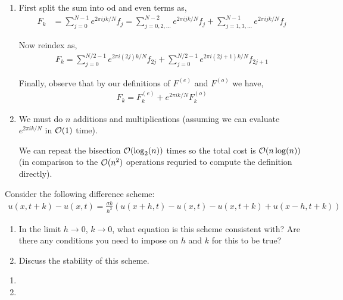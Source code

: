 \documentclass[10pt]{article}
\begin{document}
\begin{solution}[Solution]
    \begin{enumerate}[label=(\alph*)]
    \item
        First split the sum into od and even terms as,
            \begin{align*}
                F_k &= \sum_{j=0}^{N-1}e^{2\pi i j k/N} f_j 
                = \sum_{j=0,2,\ldots}^{N-2} e^{2\pi i j k/N} f_j + \sum_{j=1,3,\ldots}^{N-1} e^{2\pi i j k/N} f_j
            \end{align*}
            
        Now reindex as,
            \begin{align*}
                F_k = \sum_{j=0}^{N/2-1} e^{2\pi i (2j) k / N} f_{2j} + \sum_{j=0}^{N/2-1} e^{2\pi i (2j+1)k/N} f_{2j+1}
            \end{align*}

            Finally, observe that by our definitions of \( F^{(e)} \) and \( F^{(o)} \) we have,
        \begin{align*}
            F_k= F_k^{(e)} + e^{2\pi i k/N} F_k^{(o)}
       \end{align*}
            
    \item 
        We must do \( n \) additions and multiplications (assuming we can evaluate \( e^{2\pi ik/N} \) in \( \mathcal{O}(1) \) time). 

            We can repeat the bisection \( \mathcal{O}(\log_2(n)) \) times so the total cost is \( \mathcal{O}(n\log(n)) \) (in comparison to the \( \mathcal{O}(n^2) \) operations requried to compute the definition directly).


\end{enumerate}    
\end{solution}


\begin{problem}
Consider the following difference scheme:
\begin{align*}
    u(x,t+k)- u(x,t) = \frac{\sigma k}{h^2} (u(x+h,t)-u(x,t)-u(x,t+k)+u(x-h,t+k))
\end{align*}
\begin{enumerate}[nolistsep,label=(\alph*)]
    \item In the limit \( h\to0 \), \( k\to 0 \), what equation is this scheme consistent with? Are there any conditions you need to impose on \( h \) and \( k \) for this to be true?
    \item Discuss the stability of this scheme.
\end{enumerate}
\end{problem}

\begin{solution}[Solution]
\begin{enumerate}[label=(\alph*)]
    \item 
    \item 
\end{enumerate}

\end{solution}
\end{document}
